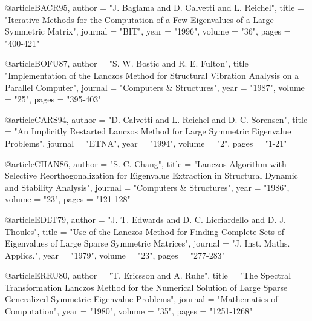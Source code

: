 

@article{BACR95,
   author       = "J. Baglama and D. Calvetti and L. Reichel", 
   title        = "{Iterative Methods for the Computation of a Few
                   Eigenvalues of a Large Symmetric Matrix}",
   journal      = "BIT",
   year         = "1996",
   volume       = "36",
   pages        = "400-421"}

@article{BOFU87,
   author       = "S. W. Bostic and R. E. Fulton",
   title        = "{Implementation of the Lanczos Method for Structural 
                   Vibration Analysis on a Parallel Computer}",
   journal      = "Computers \& Structures",
   year         = "1987",
   volume       = "25",
   pages        = "395-403"}

@article{CARS94,
   author       = "D. Calvetti and L. Reichel and D. C. Sorensen",
   title        = "{An Implicitly Restarted Lanczos Method for
                   Large Symmetric Eigenvalue Problems}",
   journal      = "ETNA",
   year         = "1994",
   volume       = "2",
   pages        = "1-21"}

@article{CHAN86,
   author       = "S.-C. Chang",
   title        = "{Lanczos Algorithm with Selective Reorthogonalization
                   for Eigenvalue Extraction in Structural Dynamic
                   and Stability Analysis}",
   journal      = "Computers \& Structures",
   year         = "1986",
   volume       = "23",
   pages        = "121-128"}

@article{EDLT79,
   author       = "J. T. Edwards and D. C. Licciardello and
                   D. J. Thoules",
   title        = "{Use of the Lanczos Method for Finding Complete
                   Sets of Eigenvalues of Large Sparse
                   Symmetric Matrices}",
   journal      = "J. Inst. Maths. Applics.",
   year         = "1979",
   volume       = "23",
   pages        = "277-283"}

@article{ERRU80,
   author       = "T. Ericsson and A. Ruhe",
   title        = "{The Spectral Transformation Lanczos Method
                   for the Numerical Solution of Large Sparse
                   Generalized Symmetric Eigenvalue Problems}",
   journal      = "Mathematics of Computation",
   year         = "1980",
   volume       = "35",
   pages        = "1251-1268"}


